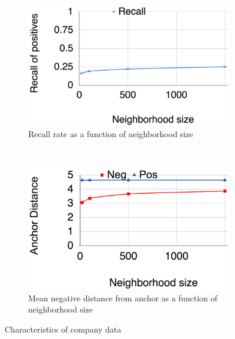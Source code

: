 \begin{figure}[htb]
    \centering
    \begin{subfigure}[t]{0.5\textwidth}
        \centering
        \includegraphics[width=.9\linewidth]{company_recall}
        \caption{Recall rate as a function of neighborhood size}
        \label{company_recall}
    \end{subfigure}%
    ~
    \begin{subfigure}[t]{0.5\textwidth}
        \centering
        \includegraphics[width=.9\linewidth]{company_distances}
        \caption{Mean negative distance from anchor as a function of neighborhood size}
        \label{modified_loss}
    \end{subfigure}
    \label{company_distances}
    \caption{Characteristics of company data}
\label{company_characteristics}
\end{figure}
